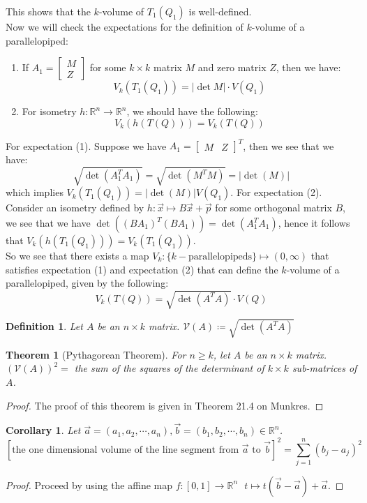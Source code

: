 \documentclass[15pt]{book}
\theoremstyle{break}
\theoremstyle{break}
\newtheorem{thm}{Theorem}[section]
\newtheorem{corT}[lem]{Corollary}
\newtheorem{defn}{Definition}[corL]
\newcommand{\R}{\mathbb{R}}
\newcommand{\bmat}[1]{\begin{bmatrix} #1 \end{bmatrix}}
\begin{document}
This shows that the $k$-volume of $T_1(Q_1)$ is well-defined. \\
Now we will check the expectations for the definition of $k$-volume of a parallelopiped:
\begin{enumerate}[topsep=3pt,itemsep=-1ex,partopsep=1ex,parsep=1ex]
\item If $A_1 = \bmat{M \\ Z}$ for some $k\times k$ matrix $M$ and zero matrix $Z$, then we have: 
$$V_k(T_1(Q_1))= |\det M|\cdot V(Q_1)$$
\item For isometry $h:\R^n \to \R^n$, we should have the following:
$$V_k(h(T(Q))) = V_k(T(Q))$$
\end{enumerate}
For expectation (1). Suppose we have $A_1 = \bmat{M&Z}^T$, then we see that we have: 
$$\sqrt{\det(A_1^TA_1)} = \sqrt{\det(M^TM)} = |\det(M)|$$ 
which implies $V_k(T_1(Q_1)) = |\det(M)| V(Q_1)$. For  expectation (2). Consider an isometry defined by $h:\vec{x}\mapsto B\vec{x}+\vec{p}$ for some orthogonal matrix $B$, we see that we have $\det((BA_1)^T(BA_1)) = \det(A_1^TA_1)$, hence it follows that $V_k(h(T_1(Q_1))) = V_k(T_1(Q_1))$.\\

So we see that there exists a map 
$V_k: \{k-\text{parallelopipeds}\}\mapsto (0,\infty)$ that satisfies expectation (1) and expectation (2) that can define the $k$-volume of a parallelopiped, given by the following:
$$V_k(T(Q)) = \sqrt{\det(A^TA)}\cdot V(Q)$$

\begin{defn}
Let $A$ be an $n \times k$ matrix. $\mathcal{V}(A) \coloneqq \sqrt{\det(A^TA)}$
\end{defn}

\begin{thm}[Pythagorean Theorem]
For $n\geq k$, let $A$ be an $n \times k$ matrix. \\
$(\mathcal{V}(A))^2=$ the sum of the squares of the determinant of $k \times k$ sub-matrices of $A$. 
\end{thm}
\begin{proof}
The proof of this theorem is given in Theorem 21.4 on Munkres.
\end{proof}

\begin{corT}
Let $\vec{a}=(a_1,a_2,\cdots,a_n),\vec{b}=(b_1,b_2,\cdots,b_n)\in \R^n$. \\$$\left[\text{the one dimensional volume of the line segment from }\vec{a}\text{ to }\vec{b}\right]^2 = \sum_{j=1}^n (b_j - a_j)^2$$
\end{corT}
\begin{proof}
Proceed by using the affine map $f:[0,1] \to \R^n \ \ \ t\mapsto t(\vec{b}-\vec{a})+\vec{a}$. 
\end{proof}
\end{document}
